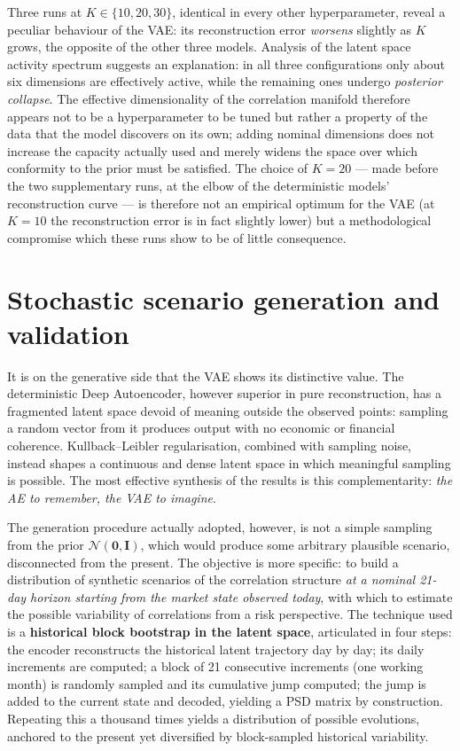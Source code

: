 \documentclass[11pt,a4paper]{article}
\begin{document}
Three runs at $K \in \{10, 20, 30\}$, identical in every other hyperparameter,
reveal a peculiar behaviour of the VAE: its reconstruction error \emph{worsens}
slightly as $K$ grows, the opposite of the other three models. Analysis of the
latent space activity spectrum suggests an explanation: in all three configurations only
about six dimensions are effectively active, while the remaining ones undergo
\emph{posterior collapse}. The effective dimensionality of the correlation
manifold therefore appears not to be a hyperparameter to be tuned but rather a property of the
data that the model discovers on its own; adding nominal dimensions does not
increase the capacity actually used and merely widens the space over which
conformity to the prior must be satisfied. The choice of $K = 20$ --- made
before the two supplementary runs, at the elbow of the deterministic models'
reconstruction curve --- is therefore not an empirical optimum for the VAE (at
$K = 10$ the reconstruction error is in fact slightly lower) but a
methodological compromise which these runs show to be of little consequence.

\section{Stochastic scenario generation and validation}

It is on the generative side that the VAE shows its distinctive value. The
deterministic Deep Autoencoder, however superior in pure reconstruction, has a
fragmented latent space devoid of meaning outside the observed points:
sampling a random vector from it produces output with no economic or financial
coherence. Kullback--Leibler regularisation, combined with sampling noise,
instead shapes a continuous and dense latent space in which meaningful
sampling is possible. The most effective synthesis of the results is this
complementarity: \emph{the AE to remember, the VAE to imagine}.

The generation procedure actually adopted, however, is not a simple sampling
from the prior $\mathcal{N}(\mathbf{0},\mathbf{I})$, which would produce some
arbitrary plausible scenario, disconnected from the present. The objective is
more specific: to build a distribution of synthetic scenarios of the
correlation structure \emph{at a nominal 21-day horizon starting from the
market state observed today}, with which to estimate the possible variability
of correlations from a risk perspective. The technique
used is a \textbf{historical block bootstrap in the latent space}, articulated
in four steps: the encoder reconstructs the historical latent trajectory day by
day; its daily increments are computed; a block of 21 consecutive increments
(one working month) is randomly sampled and its cumulative jump computed; the
jump is added to the current state and decoded, yielding a PSD matrix by
construction. Repeating this a thousand times yields a distribution of possible
evolutions, anchored to the present yet diversified by block-sampled historical
variability.
\end{document}
